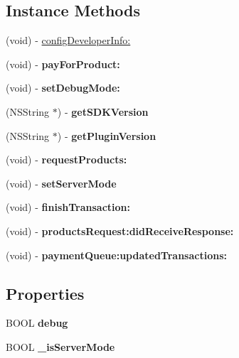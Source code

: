 \subsection*{Instance Methods}
\begin{DoxyCompactItemize}
\item 
(void) -\/ \hyperlink{interfaceIOSIAP_a2b1f700a708db50efb07ecc7f31b82de}{config\+Developer\+Info\+:}
\item 
\mbox{\label{interfaceIOSIAP_a2801e758996ca2ba2e58246766b5f33b}} 
(void) -\/ {\bfseries pay\+For\+Product\+:}
\item 
\mbox{\label{interfaceIOSIAP_aa54c46fda9808276f059865a8f877f5a}} 
(void) -\/ {\bfseries set\+Debug\+Mode\+:}
\item 
\mbox{\label{interfaceIOSIAP_ad72def8a30bb3c0a47914bd5882d27d5}} 
(N\+S\+String $\ast$) -\/ {\bfseries get\+S\+D\+K\+Version}
\item 
\mbox{\label{interfaceIOSIAP_a1027ef66d19b3de7f3fee52c57eb7f1a}} 
(N\+S\+String $\ast$) -\/ {\bfseries get\+Plugin\+Version}
\item 
\mbox{\label{interfaceIOSIAP_a911a4bb388a72bc92f4dacc5a71ca9c3}} 
(void) -\/ {\bfseries request\+Products\+:}
\item 
\mbox{\label{interfaceIOSIAP_a47eadb9b34fa59c90112c7b0fe97c599}} 
(void) -\/ {\bfseries set\+Server\+Mode}
\item 
\mbox{\label{interfaceIOSIAP_a080a5935a5a2b6667895e86b5ab45ced}} 
(void) -\/ {\bfseries finish\+Transaction\+:}
\item 
\mbox{\label{interfaceIOSIAP_ac3a2bea1f16cc3cff252ad2c2ffb2a72}} 
(void) -\/ {\bfseries products\+Request\+:did\+Receive\+Response\+:}
\item 
\mbox{\label{interfaceIOSIAP_af645f9277ec5361b0f0d3eb38592a1af}} 
(void) -\/ {\bfseries payment\+Queue\+:updated\+Transactions\+:}
\end{DoxyCompactItemize}
\subsection*{Properties}
\begin{DoxyCompactItemize}
\item 
\mbox{\label{interfaceIOSIAP_a244a78312336715a55613c437e6f253b}} 
B\+O\+OL {\bfseries debug}
\item 
\mbox{\label{interfaceIOSIAP_ad41a02450326970f3528d1ce8a8b73c9}} 
B\+O\+OL {\bfseries \+\_\+is\+Server\+Mode}
\end{DoxyCompactItemize}



